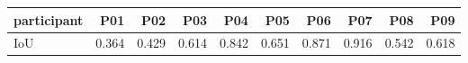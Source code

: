 \begin{tabular}{lrrrrrrrrr}
\toprule
participant & P01 & P02 & P03 & P04 & P05 & P06 & P07 & P08 & P09 \\
\midrule
IoU & 0.364 & 0.429 & 0.614 & 0.842 & 0.651 & 0.871 & 0.916 & 0.542 & 0.618 \\
\bottomrule
\end{tabular}
